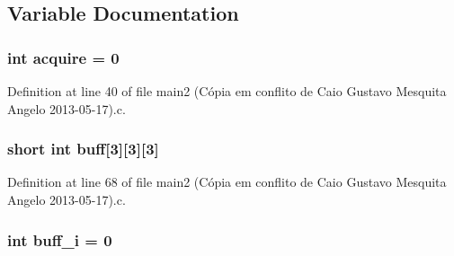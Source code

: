 \subsection{Variable Documentation}
\hypertarget{main2_01_07C_xC3_xB3pia_01em_01conflito_01de_01Caio_01Gustavo_01Mesquita_01Angelo_012013-05-17_08_8c_a95a859aa805a58cd4c59e172d250de4a}{
\subsubsection[{acquire}]{\setlength{\rightskip}{0pt plus 5cm}int acquire = 0}}\label{main2_01_07C_xC3_xB3pia_01em_01conflito_01de_01Caio_01Gustavo_01Mesquita_01Angelo_012013-05-17_08_8c_a95a859aa805a58cd4c59e172d250de4a}


Definition at line 40 of file main2 (\-Cópia em conflito de Caio Gustavo Mesquita Angelo 2013-\/05-\/17).\-c.

\hypertarget{main2_01_07C_xC3_xB3pia_01em_01conflito_01de_01Caio_01Gustavo_01Mesquita_01Angelo_012013-05-17_08_8c_aaa9d39905d1be632c8232f11155291d0}{
\subsubsection[{buff}]{\setlength{\rightskip}{0pt plus 5cm}short int buff\mbox{[}3\mbox{]}\mbox{[}3\mbox{]}\mbox{[}3\mbox{]}}}\label{main2_01_07C_xC3_xB3pia_01em_01conflito_01de_01Caio_01Gustavo_01Mesquita_01Angelo_012013-05-17_08_8c_aaa9d39905d1be632c8232f11155291d0}


Definition at line 68 of file main2 (\-Cópia em conflito de Caio Gustavo Mesquita Angelo 2013-\/05-\/17).\-c.

\hypertarget{main2_01_07C_xC3_xB3pia_01em_01conflito_01de_01Caio_01Gustavo_01Mesquita_01Angelo_012013-05-17_08_8c_ac0f4eb3a1def152855159c698feaf977}{
\subsubsection[{buff\-\_\-i}]{\setlength{\rightskip}{0pt plus 5cm}int buff\-\_\-i = 0}}\label{main2_01_07C_xC3_xB3pia_01em_01conflito_01de_01Caio_01Gustavo_01Mesquita_01Angelo_012013-05-17_08_8c_ac0f4eb3a1def152855159c698feaf977}


